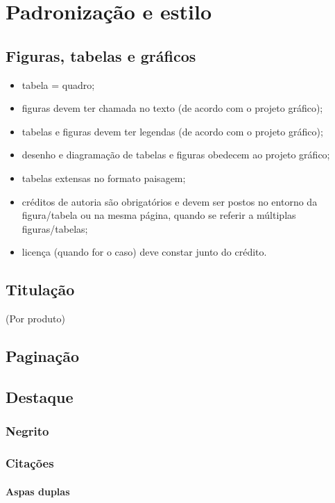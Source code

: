 \chapter{Padronização e estilo}

\section{Figuras, tabelas e gráficos}

\begin{itemize}
\item tabela = quadro;
\item figuras devem ter chamada no texto (de acordo com o projeto gráfico);
\item tabelas e figuras devem ter legendas (de acordo com o projeto gráfico);
\item desenho e diagramação de tabelas e figuras obedecem ao projeto gráfico;
\item tabelas extensas no formato paisagem;
\item créditos de autoria são obrigatórios e devem ser postos no entorno da figura/tabela ou na mesma página, quando se referir a múltiplas figuras/tabelas;
\item licença (quando for o caso) deve constar junto do crédito.
\end{itemize}

\section{Titulação}

(Por produto)

\section{Paginação}

\section{Destaque}

\subsection{Negrito}

\subsection{Citações}

\subsubsection{Aspas duplas}

